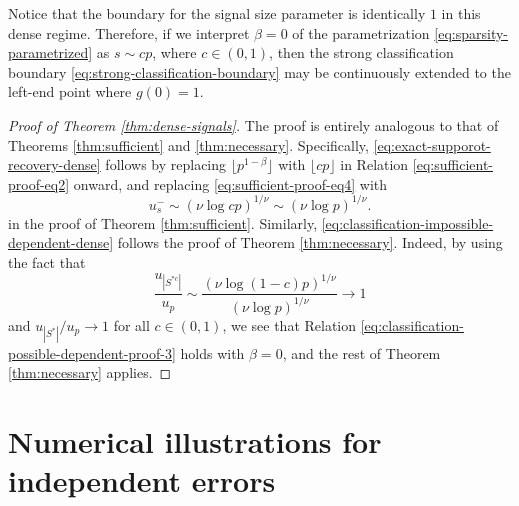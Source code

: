 \begin{remark}
Notice that the boundary for the signal size parameter is identically $1$ in this dense regime.
Therefore, if we interpret $\beta = 0$ of the parametrization \eqref{eq:sparsity-parametrized} as $s\sim cp$, where $c\in(0,1)$, then the strong classification boundary \eqref{eq:strong-classification-boundary} may be continuously extended to the left-end point where $g(0)=1$.
\end{remark}

\begin{proof}[Proof of Theorem \ref{thm:dense-signals}]
The proof is entirely analogous to that of Theorems \ref{thm:sufficient} and \ref{thm:necessary}.
Specifically, \eqref{eq:exact-supporot-recovery-dense} follows by replacing $\lfloor p^{1-\beta} \rfloor$ with $\lfloor cp \rfloor$ in Relation \eqref{eq:sufficient-proof-eq2} onward, and replacing \eqref{eq:sufficient-proof-eq4} with
$$
u_s^- \sim (\nu\log{cp})^{1/\nu} \sim (\nu\log{p})^{1/\nu}.
$$
in the proof of Theorem \ref{thm:sufficient}.
Similarly, \eqref{eq:classification-impossible-dependent-dense} follows the proof of Theorem \ref{thm:necessary}. 
Indeed, by using the fact that
$$
\frac{u_{|S^{*c}|}}{u_p} \sim \frac{(\nu\log{(1-c)p})^{1/\nu}}{(\nu\log{p})^{1/\nu}} \to 1
$$
and ${u_{|S^*|}}/{u_p}\to 1$ for all $c\in(0,1)$, we see that Relation \eqref{eq:classification-possible-dependent-proof-3} holds with $\beta=0$, and the rest of Theorem \ref{thm:necessary} applies.
\end{proof}


\section{Numerical illustrations for independent errors}
\label{suppsec:numerical}

